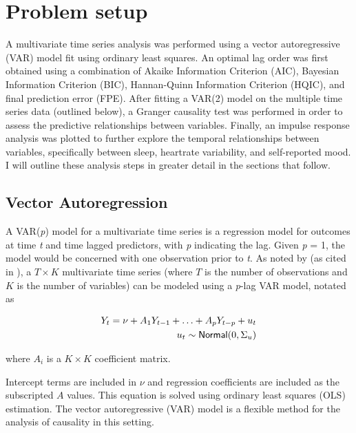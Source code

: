 \documentclass{article}
\begin{document}
\hypertarget{methods}{%
\section{Problem setup}\label{methods}}

A multivariate time series analysis was performed using a vector autoregressive
(VAR) model fit using ordinary least squares. An optimal lag order was first
obtained using a combination of Akaike Information Criterion (AIC), Bayesian
Information Criterion (BIC), Hannan-Quinn Information Criterion (HQIC), and
final prediction error (FPE). After fitting a VAR(2) model on the multiple time
series data (outlined below), a Granger causality test was performed in order to
assess the predictive relationships between variables. Finally, an impulse
response analysis was plotted to further explore the temporal relationships
between variables, specifically between sleep, heartrate variability, and
self-reported mood. I will outline these analysis steps in greater detail in the
sections that follow.

\hypertarget{vector-autoregression}{%
\subsection{Vector Autoregression}\label{vector-autoregression}}


A VAR(\textit{p}) model for a multivariate time series is a regression model for
outcomes at time \textit{t} and time lagged predictors, with \textit{p}
indicating the lag. Given \textit{p} = 1, the model would be concerned with one
observation prior to \textit{t}. As noted by \citet{lutkepohlNew2005}
(as cited in \citealt{seabold2010statsmodels}), a \(T \times K\) multivariate time
series (where \(T\) is the number of observations and \(K\) is the number of
variables) can be modeled using a \textit{p}-lag VAR model, notated as


\begin{equation}
  \begin{split}
    Y_t = \nu + A_1 Y_{t-1} + \ldots + A_p Y_{t-p} + u_t \\ u_t \sim {\sf Normal}(0, \Sigma_u)
  \end{split}
\end{equation}

where \(A_i\) is a \(K \times K\) coefficient matrix.


Intercept terms are included in \(\nu\) and regression coefficients are included
as the subscripted \(A\) values. This equation is solved using ordinary least
squares (OLS) estimation. The vector autoregressive (VAR) model is a flexible
method for the analysis of causality in this setting.
\end{document}
